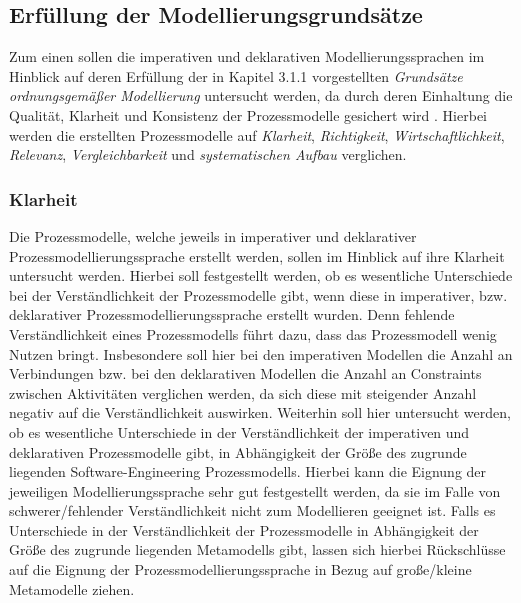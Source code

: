 \subsection{Erfüllung der Modellierungsgrundsätze}
Zum einen sollen die imperativen und deklarativen Modellierungssprachen im Hinblick auf deren Erfüllung der in Kapitel 3.1.1 vorgestellten \textit{Grundsätze ordnungsgemäßer Modellierung} untersucht werden, da durch deren Einhaltung die Qualität, Klarheit und Konsistenz der Prozessmodelle gesichert wird \cite{freund2007}. Hierbei werden die erstellten Prozessmodelle auf \textit{Klarheit}, \textit{Richtigkeit}, \textit{Wirtschaftlichkeit}, \textit{Relevanz}, \textit{Vergleichbarkeit} und \textit{systematischen Aufbau} verglichen.

\subsubsection{Klarheit}
Die Prozessmodelle, welche jeweils in imperativer und deklarativer Prozessmodellierungssprache erstellt werden, sollen im Hinblick auf ihre Klarheit untersucht werden. Hierbei soll festgestellt werden, ob es wesentliche Unterschiede bei der Verständlichkeit der Prozessmodelle gibt, wenn diese in imperativer, bzw. deklarativer Prozessmodellierungssprache erstellt wurden. Denn fehlende Verständlichkeit eines Prozessmodells führt dazu, dass das Prozessmodell wenig Nutzen bringt. Insbesondere soll hier bei den imperativen Modellen die Anzahl an Verbindungen bzw. bei den deklarativen Modellen die Anzahl an Constraints zwischen Aktivitäten verglichen werden, da sich diese mit steigender Anzahl negativ auf die Verständlichkeit auswirken.\newline
Weiterhin soll hier untersucht werden, ob es wesentliche Unterschiede in der Verständlichkeit der imperativen und deklarativen Prozessmodelle gibt, in Abhängigkeit der Größe des zugrunde liegenden Software-Engineering Prozessmodells. Hierbei kann die Eignung der jeweiligen Modellierungssprache sehr gut festgestellt werden, da sie im Falle von schwerer/fehlender Verständlichkeit nicht zum Modellieren geeignet ist. Falls es Unterschiede in der Verständlichkeit der Prozessmodelle in Abhängigkeit der Größe des zugrunde liegenden Metamodells gibt, lassen sich hierbei Rückschlüsse auf die Eignung der Prozessmodellierungssprache in Bezug auf große/kleine Metamodelle ziehen.
